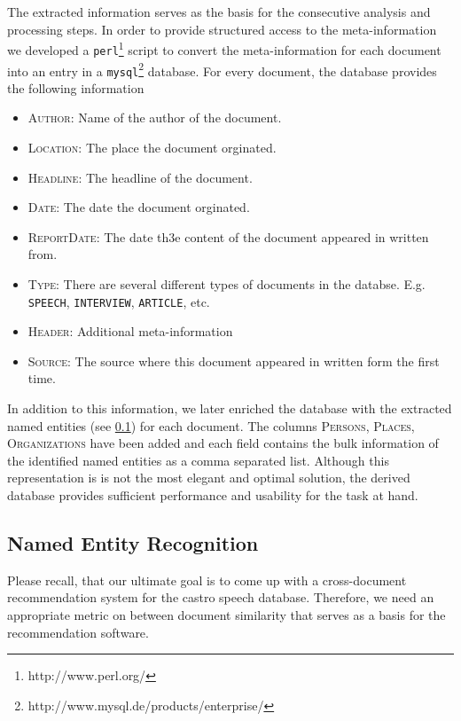 The extracted information serves as the basis for the consecutive analysis and processing steps. In
order to provide structured access to the meta-information we developed a
\texttt{perl}\footnote{http://www.perl.org/} script to convert the meta-information for each
document into an entry in a \texttt{mysql}\footnote{http://www.mysql.de/products/enterprise/}
database. For every document, the database provides the following information
\begin{itemize}
 \item{\textsc{Author:} Name of the author of the document.}
 \item{\textsc{Location:} The place the document orginated.}
 \item{\textsc{Headline:} The headline of the document.}
 \item{\textsc{Date:} The date the document orginated.}
 \item{\textsc{ReportDate:} The date th3e content of the document appeared in written from.}
 \item{\textsc{Type:} There are several different types of documents in the databse. E.g.
 \texttt{SPEECH}, \texttt{INTERVIEW}, \texttt{ARTICLE}, etc.}
 \item{\textsc{Header:} Additional meta-information}
 \item{\textsc{Source:} The source where this document appeared in written form the first time.}
\end{itemize}
In addition to this information, we later enriched the database with the extracted named entities
(see \ref{sec:named_entity_recognition}) for each document. The columns \textsc{Persons},
\textsc{Places}, \textsc{Organizations} have been added and each field contains the bulk information
of the identified named entities as a comma separated list. Although this representation is is not
the most elegant and optimal solution, the derived database provides sufficient performance and
usability for the task at hand.

\subsection {Named Entity Recognition}
\label{sec:named_entity_recognition}
Please recall, that our ultimate goal is to come up with a cross-document recommendation system for
the castro speech database. Therefore, we need an appropriate metric on between document
similarity that serves as a basis for the recommendation software.

